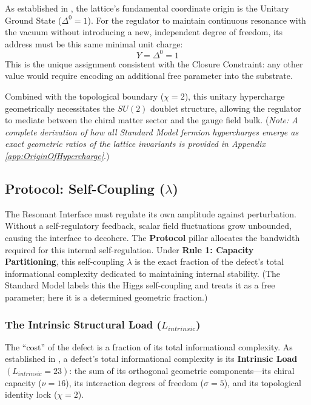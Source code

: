 As established in \cite{meyer_ieaction_2026}, the lattice's fundamental coordinate origin is the Unitary Ground State ($\Delta^0 = 1$). For the regulator to maintain continuous resonance with the vacuum without introducing a new, independent degree of freedom, its address must be this same minimal unit charge:
\begin{equation}
    Y = \Delta^0 = 1
\end{equation}
This is the unique assignment consistent with the Closure Constraint: any other value would require encoding an additional free parameter into the substrate.

Combined with the topological boundary ($\chi=2$), this unitary hypercharge geometrically necessitates the $SU(2)$ doublet structure, allowing the regulator to mediate between the chiral matter sector and the gauge field bulk. (\textit{Note: A complete derivation of how all Standard Model fermion hypercharges emerge as exact geometric ratios of the lattice invariants is provided in Appendix \ref{app:OriginOfHypercharge}}.)



\subsection{Protocol: Self-Coupling (\texorpdfstring{$\lambda$}{lambda})}
The Resonant Interface must regulate its own amplitude against perturbation. Without a self-regulatory feedback, scalar field fluctuations grow unbounded, causing the interface to decohere. The \textbf{Protocol} pillar allocates the bandwidth required for this internal self-regulation. Under \textbf{Rule 1: Capacity Partitioning}, this self-coupling $\lambda$ is the exact fraction of the defect's total informational complexity dedicated to maintaining internal stability. (The Standard Model labels this the Higgs self-coupling and treats it as a free parameter; here it is a determined geometric fraction.)

\subsubsection{The Intrinsic Structural Load (\texorpdfstring{$L_{intrinsic}$}{Lintrinsic})}
The ``cost'' of the defect is a fraction of its total informational complexity. As established in \cite{meyer_informational_2026}, a defect's total informational complexity is its \textbf{Intrinsic Load} $(L_{intrinsic} = 23)$: the sum of its orthogonal geometric components---its chiral capacity ($\nu=16$), its interaction degrees of freedom ($\sigma=5$), and its topological identity lock ($\chi=2$).

